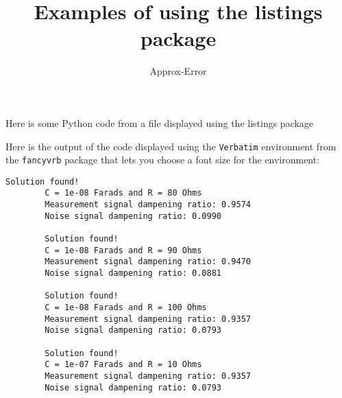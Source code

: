 \documentclass{article}
\title{Examples of using the listings package}
\author{Approx-Error}
\begin{document}
    \normalsize
    \maketitle

    Here is some Python code from a file displayed using the listings package

    

    Here is the output of the code displayed using the \texttt{Verbatim} environment from the \texttt{fancyvrb} package
    that lets you choose a font size for the environment:

    \begin{Verbatim}[fontsize=\small]
        Solution found!
        C = 1e-08 Farads and R = 80 Ohms
        Measurement signal dampening ratio: 0.9574
        Noise signal dampening ratio: 0.0990

        Solution found!
        C = 1e-08 Farads and R = 90 Ohms
        Measurement signal dampening ratio: 0.9470
        Noise signal dampening ratio: 0.0881

        Solution found!
        C = 1e-08 Farads and R = 100 Ohms
        Measurement signal dampening ratio: 0.9357
        Noise signal dampening ratio: 0.0793

        Solution found!
        C = 1e-07 Farads and R = 10 Ohms
        Measurement signal dampening ratio: 0.9357
        Noise signal dampening ratio: 0.0793
    \end{Verbatim}
\end{document}
